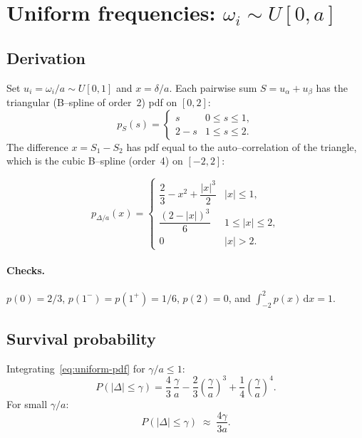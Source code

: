 \documentclass[a4paper,11pt]{article}
\newcommand{\de}{\mathrm{d}}
\begin{document}
\section{Uniform frequencies: $\omega_i \sim U[0,a]$}

\subsection{Derivation}

Set $u_i = \omega_i / a \sim U[0,1]$ and $x = \delta/a$.
Each pairwise sum $S = u_\alpha + u_\beta$ has the triangular
(B--spline of order~2) pdf on $[0,2]$:
\[
  p_S(s) = \begin{cases} s & 0\le s\le 1,\\ 2-s & 1\le s\le 2.\end{cases}
\]
The difference $x = S_1 - S_2$ has pdf equal to the auto--correlation
of the triangle, which is the cubic B--spline (order~4) on $[-2,2]$:

\begin{equation}\label{eq:uniform-pdf}
  \boxed{
  p_{\Delta/a}(x) = \begin{cases}
    \dfrac{2}{3} - x^2 + \dfrac{|x|^3}{2}
      & |x| \leq 1 , \\[8pt]
    \dfrac{(2-|x|)^3}{6}
      & 1 \leq |x| \leq 2 , \\[8pt]
    0 & |x| > 2 .
  \end{cases}}
\end{equation}

\paragraph{Checks.}
$p(0) = 2/3$, \; $p(1^-) = p(1^+) = 1/6$, \; $p(2) = 0$,
and $\int_{-2}^{2}p(x)\,\de x = 1$.

\subsection{Survival probability}

Integrating~\eqref{eq:uniform-pdf} for $\gamma/a \leq 1$:
\begin{equation}\label{eq:uniform-P}
  \boxed{
  P\!\left(|\Delta| \leq \gamma\right)
  = \frac{4}{3}\,\frac{\gamma}{a}
    - \frac{2}{3}\left(\frac{\gamma}{a}\right)^{\!3}
    + \frac{1}{4}\left(\frac{\gamma}{a}\right)^{\!4} .}
\end{equation}
For small $\gamma/a$:
\begin{equation}
  P(|\Delta|\leq\gamma) \;\approx\; \frac{4\gamma}{3a} .
\end{equation}
\end{document}
